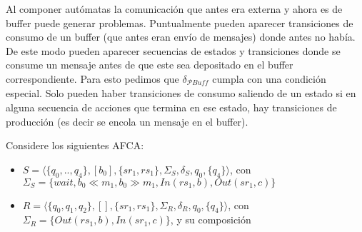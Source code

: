 Al componer autómatas la comunicación que antes era externa y ahora es de buffer puede generar problemas. Puntualmente pueden aparecer transiciones de consumo de un buffer (que antes eran envío de mensajes) donde antes no había. De este modo pueden aparecer secuencias de estados y transiciones donde se consume un mensaje antes de que este sea depositado en el buffer correspondiente. Para esto pedimos que $\delta_\mathit{\mathcal{P}Buff}$ cumpla con una condición especial. Solo pueden haber transiciones de consumo saliendo de un estado si en alguna secuencia de acciones que termina en ese estado, hay transiciones de producción (es decir se encola un mensaje en el buffer).

\begin{example}
\label{ex:Composicion}
Considere los siguientes AFCA:
\begin{itemize}
    \item $S= \langle \{q_0,..,q_4\},[b_0],\{sr_1,rs_1\}, \Sigma_S, \delta_S, q_0, \{q_4\} \rangle$, con $\Sigma_S =\{wait, b_0 \ll m_1,b_0 \gg m_1, In(rs_1,b), Out(sr_1,c) \}$
\begin{center}
\end{center}
        \item $R=\langle \{q_0,q_1,q_2\},[],\{sr_1,rs_1\}, \Sigma_R, \delta_R, q_0, \{q_4\} \rangle$, con $\Sigma_R = \{Out(rs_1,b), In(sr_1,c)\}$, y su composición
\begin{center}

\end{center}
\end{itemize}
\end{example}
